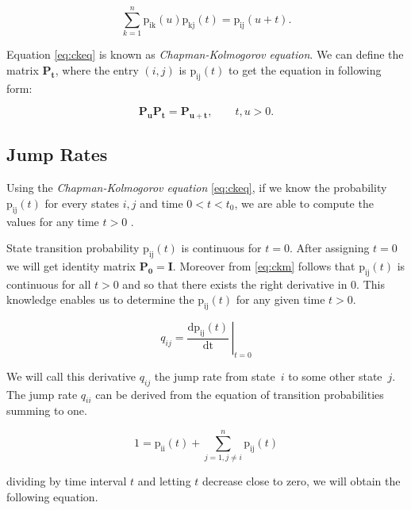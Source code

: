 \documentclass[thesis=M,english]{FITthesis}[2012/10/20]
\newcommand{\matr}[1]{\mathbf{#1}}
\begin{document}
\begin{equation}\label{eq:ckeq}
\sum_{k = 1}^n\mathrm{p_{ik}}(u)\mathrm{p_{kj}}(t) = \mathrm{p_{ij}}(u+t).     
\end{equation}

Equation \eqref{eq:ckeq} is known as \textit{Chapman-Kolmogorov equation}. 
We can define the matrix $\matr{P_t}$, where the entry $(i,j)$ is $\mathrm{p_{ij}}(t)$ to get the equation in following form:

\begin{equation}\label{eq:ckm}
\matr{P_u} \matr{P_t} = \matr{P_{u+t}},   \qquad t,u > 0.  
\end{equation}

\subsection{ Jump Rates }

Using the \textit{Chapman-Kolmogorov equation} \eqref{eq:ckeq}, if we know the probability $\mathrm{p_{ij}}(t)$ for every states $i,j$ and time $0 < t < t_0$, we are able to compute the values for any time $t > 0$ \cite{Ka75}. 

State transition probability $\mathrm{p_{ij}}(t)$ is continuous for $t=0$. After assigning $t=0$ we will get identity matrix $\matr{P_0} = \matr{I}$.
Moreover from \eqref{eq:ckm} follows that $\mathrm{p_{ij}}(t)$ is continuous for all $t>0$  and so that there exists the right derivative in 0. This knowledge enables us to determine the $\mathrm{p_{ij}}(t)$ for any given time $t>0$.   

\begin{equation}
q_{ij} =  \left.\frac{\mathrm{d}\mathrm{p_{ij}}(t)}{\mathrm{dt}} \,\right|_{t=0} 
\end{equation}



We will call this derivative $q_{ij}$ the jump rate from state~$i$ to some other state~$j$. The jump rate $q_{ii}$ can be derived from the equation of transition probabilities summing to one.

\begin{equation}
1 = \mathrm{p_{ii}}(t) + \sum_{j = 1,j \neq i}^{ n } \mathrm{p_{ij}}(t) 
\end{equation}

dividing by time interval $t$ and letting $t$ decrease close to zero, we will obtain the following equation. 
\end{document}
